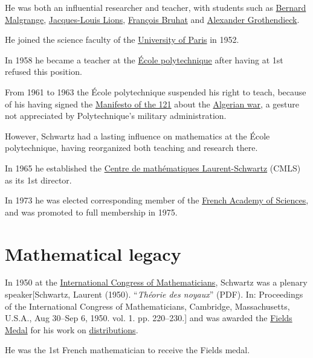 \documentclass{book}
\numberwithin{equation}{section}
\begin{document}
He was both an influential researcher and teacher, with students such as \href{https://en.wikipedia.org/wiki/Bernard_Malgrange}{Bernard Malgrange}, \href{https://en.wikipedia.org/wiki/Jacques-Louis_Lions}{Jacques-Louis Lions}, \href{https://en.wikipedia.org/wiki/Fran%C3%A7ois_Bruhat}{François Bruhat} and \href{https://en.wikipedia.org/wiki/Alexander_Grothendieck}{Alexander Grothendieck}.
    
He joined the science faculty of the \href{https://en.wikipedia.org/wiki/University_of_Paris}{University of Paris} in 1952.

In 1958 he became a teacher at the \href{https://en.wikipedia.org/wiki/%C3%89cole_polytechnique}{École polytechnique} after having at 1st refused this position.
    
From 1961 to 1963 the École polytechnique suspended his right to teach, because of his having signed the \href{https://en.wikipedia.org/wiki/Manifesto_of_the_121}{Manifesto of the 121} about the \href{https://en.wikipedia.org/wiki/Algerian_war}{Algerian war}, a gesture not appreciated by Polytechnique's military administration.

However, Schwartz had a lasting influence on mathematics at the École polytechnique, having reorganized both teaching and research there.

In 1965 he established the \href{https://en.wikipedia.org/wiki/Centre_de_math%C3%A9matiques_Laurent-Schwartz}{Centre de mathématiques Laurent-Schwartz} (CMLS) as its 1st director.

%
In 1973 he was elected corresponding member of the \href{https://en.wikipedia.org/wiki/French_Academy_of_Sciences}{French Academy of Sciences}, and was promoted to full membership in 1975.

\section{Mathematical legacy}
In 1950 at the \href{https://en.wikipedia.org/wiki/International_Congress_of_Mathematicians}{International Congress of Mathematicians}, Schwartz was a plenary speaker[Schwartz, Laurent (1950). ``\textit{Théorie des noyaux}'' (PDF). In: Proceedings of the International Congress of Mathematicians, Cambridge, Massachusetts, U.S.A., Aug 30--Sep 6, 1950. vol. 1. pp. 220--230.] and was awarded the \href{https://en.wikipedia.org/wiki/Fields_Medal}{Fields Medal} for his work on \href{https://en.wikipedia.org/wiki/Distribution_(mathematics)}{distributions}.

He was the 1st French mathematician to receive the Fields medal.
\end{document}
